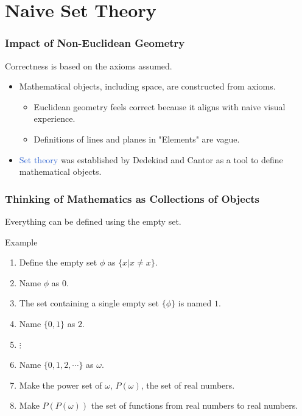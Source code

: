 \documentclass[unicode, 14pt, aspectratio=169]{beamer}
\begin{document}
\section{Naive Set Theory}
\begin{frame}
  \frametitle{Impact of Non-Euclidean Geometry}
  {\large Correctness is based on the axioms assumed.}
  \begin{itemize}
  \item Mathematical objects, including space, are constructed from axioms.
    \begin{itemize}
    \item Euclidean geometry feels correct because it aligns with naive visual experience.
    \item Definitions of lines and planes in "Elements" are vague.
    \end{itemize}
  \item \textcolor{highlight}{Set theory} was established by Dedekind and Cantor as a tool to define mathematical objects.
  \end{itemize}
\end{frame}
\begin{frame}
  \frametitle{Thinking of Mathematics as Collections of Objects}
  {\large Everything can be defined using the empty set.}
  \par
  Example
  \begin{enumerate}
  \item Define the empty set $\phi$ as $\{x|x\neq x\}$.
  \item Name $\phi$ as $0$.
  \item The set containing a single empty set $\{\phi\}$ is named $1$.
  \item Name $\{0, 1\}$ as $2$.
  \item $\vdots$
  \item Name $\{0, 1, 2, \cdots\}$ as $\omega$.
  \item Make the power set of $\omega$, $P(\omega)$, the set of real numbers.
  \item Make $P(P(\omega))$ the set of functions from real numbers to real numbers.
  \end{enumerate}
\end{frame}
\end{document}
